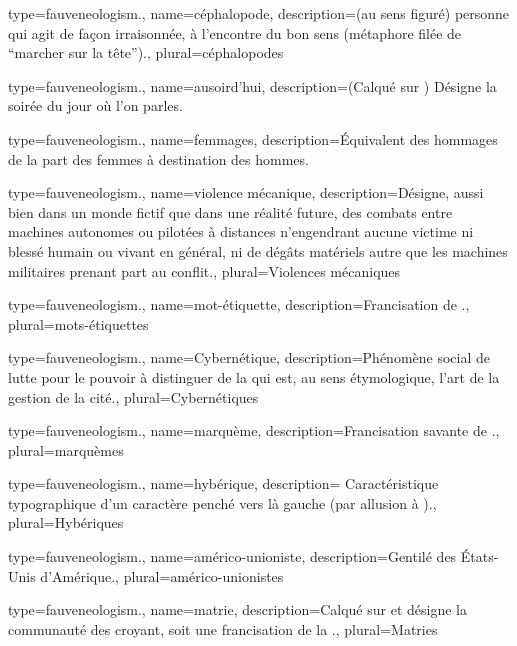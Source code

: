{
  type=fauveneologism.,
    name={céphalopode},
    description={(au sens figuré) personne qui agit de façon irraisonnée, à l’encontre du bon sens (métaphore filée de \enquote{marcher sur la tête}).},
    plural={céphalopodes}
}

{
  type=fauveneologism.,
    name={ausoird’hui},
    description={(Calqué sur ) Désigne la soirée du jour où l’on parles.}
}

{
  type=fauveneologism.,
    name={femmages},
    description={Équivalent des hommages de la part des femmes à destination des hommes.}
}

{
  type=fauveneologism.,
    name={violence mécanique},
    description={Désigne, aussi bien dans un monde fictif que dans une réalité future, des combats entre machines autonomes ou pilotées à distances n’engendrant aucune victime ni blessé humain ou vivant en général, ni de dégâts matériels autre que les machines militaires prenant part au conflit.},
    plural={Violences mécaniques}
}

{
  type=fauveneologism.,
    name={mot-étiquette},
    description={Francisation de .},
    plural={mots-étiquettes}
}

{
  type=fauveneologism.,
    name={Cybernétique},
    description={Phénomène social de lutte pour le pouvoir à distinguer de la  qui est, au sens étymologique, l’art de la gestion de la cité.},
    plural={Cybernétiques}
}

{
  type=fauveneologism.,
    name={marquème},
    description={Francisation savante de .},
    plural={marquèmes}
}

{
  type=fauveneologism.,
    name={hybérique},
    description={ Caractéristique typographique d’un caractère penché vers là gauche (par allusion à ).},
    plural={Hybériques}
}

{
  type=fauveneologism.,
    name={américo-unioniste},
    description={Gentilé des États-Unis d’Amérique.},
    plural={américo-unionistes}
}

{
  type=fauveneologism.,
    name={matrie},
    description={Calqué sur  et désigne la communauté des croyant, soit une francisation de la .},
    plural={Matries}
}

